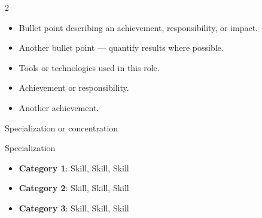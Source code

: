 \documentclass[10pt,a4paper,ragged2e,withhyper]{altacv}
\begin{document}



\makecvheader

\begin{paracol}{2}


\begin{itemize}
\item Bullet point describing an achievement, responsibility, or impact.
\item Another bullet point — quantify results where possible.
\item Tools or technologies used in this role.
\end{itemize}

\divider

\begin{itemize}
\item Achievement or responsibility.
\item Another achievement.
\end{itemize}

\switchcolumn


Specialization or concentration

\divider

Specialization

\begin{itemize}[label={}]
    \item \textbf{Category 1}: Skill, Skill, Skill
    \item \textbf{Category 2}: Skill, Skill, Skill
    \item \textbf{Category 3}: Skill, Skill, Skill
\end{itemize}


\end{paracol}
\end{document}
